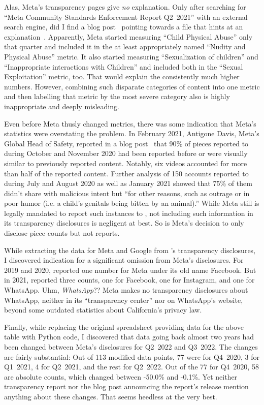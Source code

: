 Alas, Meta's transparency pages give \emph{no} explanation. Only after searching
for ``Meta Community Standards Enforcement Report Q2~2021'' with an external
search engine, did I find a blog post~\cite{Facebook2021a} pointing towards a
 file that hints at an explanation~\cite{Facebook2021}. Apparently, Meta
started measuring ``Child Physical Abuse'' only that quarter and included it in
the at least appropriately named ``Nudity and Physical Abuse'' metric. It also
started measuring ``Sexualization of children'' and ``Inappropriate interactions
with Children'' and included both in the ``Sexual Exploitation'' metric, too.
That would explain the consistently much higher numbers. However, combining such
disparate categories of content into one metric and then labelling that metric
by the most severe category also is highly inappropriate and deeply misleading.

Even before Meta thusly changed metrics, there was some indication that Meta's
statistics were overstating the problem. In February 2021, Antigone Davis,
Meta's Global Head of Safety, reported in a blog post~\cite{Davis2021} that 90\%
of pieces reported to  during October and November 2020 had been reported
before or were visually similar to previously reported content. Notably, six
videos accounted for more than half of the reported content. Further analysis of
150 accounts reported to  during July and August 2020 as well as January
2021 showed that 75\% of them didn't share  with malicious intent but
``for other reasons, such as outrage or in poor humor (i.e. a child's genitals
being bitten by an animal).'' While Meta still is legally mandated to report
such instances to , not including such information in its transparency
disclosures is negligent at best. So is Meta's decision to only disclose piece
counts but not reports.

While extracting the data for Meta and Google from 's transparency
disclosures, I discovered indication for a significant omission from Meta's
disclosures. For 2019 and 2020,  reported one number for Meta under its
old name Facebook. But in 2021,  reported three counts, one for Facebook,
one for Instagram, and one for WhatsApp. Uhm, \emph{WhatsApp}?? Meta makes no
transparency disclosures about WhatsApp, neither in its ``transparency center''
nor on WhatsApp's website, beyond some outdated statistics about California's
privacy law.

Finally, while replacing the original spreadsheet providing data for the above
table with Python code, I discovered that data going back almost two years had
been changed between Meta's disclosures for Q2~2022 and Q3~2022. The changes are
fairly substantial: Out of 113 modified data points, 77 were for Q4~2020, 3 for
Q1~2021, 4 for Q2~2021, and the rest for Q2~2022. Out of the 77 for Q4~2020, 58
are absolute counts, which changed between -50.0\% and -0.1\%. Yet neither
transparency report nor the blog post announcing the report's release mention
anything about these changes. That seems heedless at the very best.


